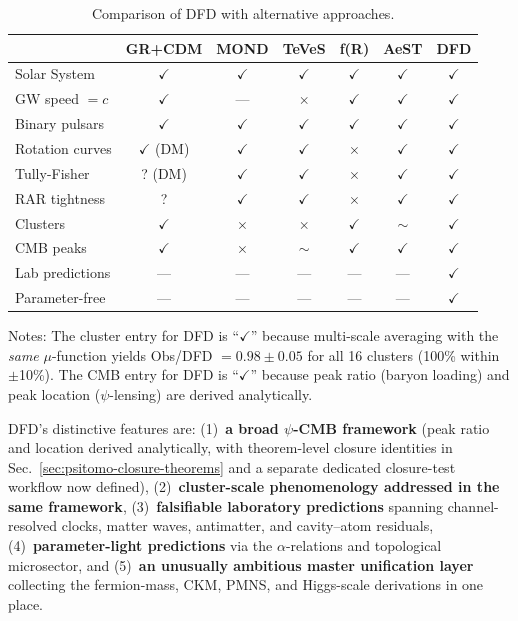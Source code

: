 \begin{table}[h]
\centering
\caption{Comparison of DFD with alternative approaches.}\label{tab:alternatives}
\renewcommand{\arraystretch}{1.2}
\begin{tabular}{lcccccc}
\toprule
 & GR+CDM & MOND & TeVeS & f(R) & AeST & DFD \\
\midrule
Solar System & $\checkmark$ & $\checkmark$ & $\checkmark$ & $\checkmark$ & $\checkmark$ & $\checkmark$ \\
GW speed $= c$ & $\checkmark$ & --- & $\times$ & $\checkmark$ & $\checkmark$ & $\checkmark$ \\
Binary pulsars & $\checkmark$ & $\checkmark$ & $\checkmark$ & $\checkmark$ & $\checkmark$ & $\checkmark$ \\
Rotation curves & $\checkmark$ (DM) & $\checkmark$ & $\checkmark$ & $\times$ & $\checkmark$ & $\checkmark$ \\
Tully-Fisher & ? (DM) & $\checkmark$ & $\checkmark$ & $\times$ & $\checkmark$ & $\checkmark$ \\
RAR tightness & ? & $\checkmark$ & $\checkmark$ & $\times$ & $\checkmark$ & $\checkmark$ \\
Clusters & $\checkmark$ & $\times$ & $\times$ & $\checkmark$ & $\sim$ & $\checkmark$ \\
CMB peaks & $\checkmark$ & $\times$ & $\sim$ & $\checkmark$ & $\checkmark$ & $\checkmark$ \\
Lab predictions & --- & --- & --- & --- & --- & $\checkmark$ \\
Parameter-free & --- & --- & --- & --- & --- & $\checkmark$ \\
\bottomrule
\end{tabular}
\end{table}

Notes: The cluster entry for DFD is ``$\checkmark$'' because multi-scale averaging with the \textit{same} $\mu$-function yields Obs/DFD $= 0.98 \pm 0.05$ for all 16 clusters (100\% within $\pm$10\%). The CMB entry for DFD is ``$\checkmark$'' because peak ratio (baryon loading) and peak location ($\psi$-lensing) are derived analytically.

DFD's distinctive features are: (1)~\textbf{a broad $\psi$-CMB framework} (peak ratio and location derived analytically, with theorem-level closure identities in Sec.~\ref{sec:psitomo-closure-theorems} and a separate dedicated closure-test workflow now defined), (2)~\textbf{cluster-scale phenomenology addressed in the same framework}, (3)~\textbf{falsifiable laboratory predictions} spanning channel-resolved clocks, matter waves, antimatter, and cavity--atom residuals, (4)~\textbf{parameter-light predictions} via the $\alpha$-relations and topological microsector, and (5)~\textbf{an unusually ambitious master unification layer} collecting the fermion-mass, CKM, PMNS, and Higgs-scale derivations in one place.

